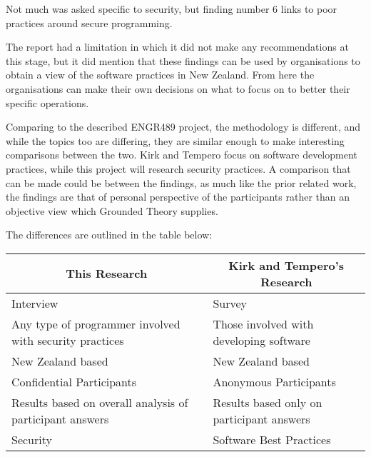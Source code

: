 \par Not much was asked specific to security, but finding number 6 links to poor practices around secure programming. 
\newline
\par The report had a limitation in which it did not make any recommendations at this stage, but it did mention that these findings can be used by organisations to obtain a view of the software practices in New Zealand. From here the organisations can make their own decisions on what to focus on to better their specific operations.  
\newline
\par Comparing to the described ENGR489 project, the methodology is different, and while the topics too are differing, they are similar enough to make interesting comparisons between the two. Kirk and Tempero focus on software development practices, while this project will research security practices. A comparison that can be made could be between the findings, as much like the prior related work, the findings are that of personal perspective of the participants rather than an objective view which Grounded Theory supplies.
\newline
\par The differences are outlined in the table below:
\newline
\newline
\begin{table}[htb]
\begin{tabular}{|l|l|}
\hline
\multicolumn{1}{|c|}{\textbf{This Research}}             & \multicolumn{1}{c|}{\textbf{Kirk and Tempero's Research}} \\ \hline
Interview                 & Survey                  \\ \hline
Any type of programmer involved with security practices  & Those involved with developing software             \\ \hline
New Zealand based         & New Zealand based       \\ \hline
Confidential Participants & Anonymous Participants  \\ \hline
Results based on overall analysis of participant answers & Results based only on participant answers                 \\ \hline
Security                  & Software Best Practices \\ \hline
\end{tabular}
\end{table}

